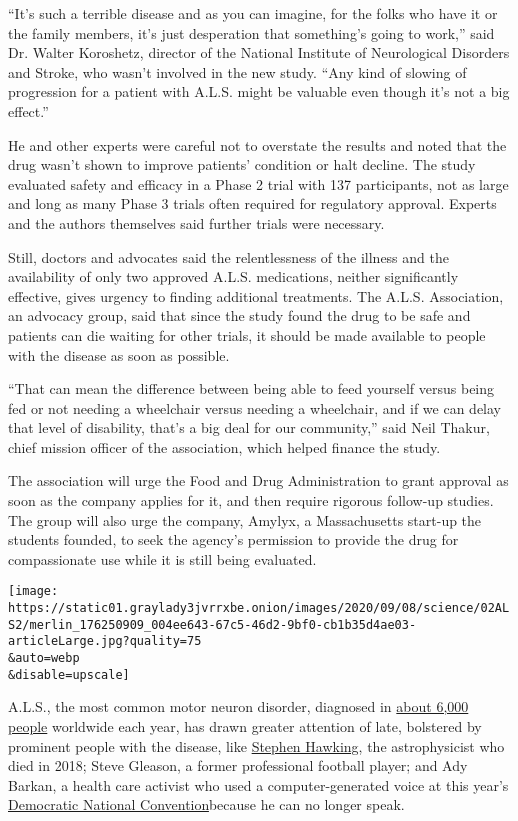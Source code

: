 ``It's such a terrible disease and as you can imagine, for the folks who
have it or the family members, it's just desperation that something's
going to work,'' said Dr. Walter Koroshetz, director of the National
Institute of Neurological Disorders and Stroke, who wasn't involved in
the new study. ``Any kind of slowing of progression for a patient with
A.L.S. might be valuable even though it's not a big effect.''

He and other experts were careful not to overstate the results and noted
that the drug wasn't shown to improve patients' condition or halt
decline. The study evaluated safety and efficacy in a Phase 2 trial with
137 participants, not as large and long as many Phase 3 trials often
required for regulatory approval. Experts and the authors themselves
said further trials were necessary.

Still, doctors and advocates said the relentlessness of the illness and
the availability of only two approved A.L.S. medications, neither
significantly effective, gives urgency to finding additional treatments.
The A.L.S. Association, an advocacy group, said that since the study
found the drug to be safe and patients can die waiting for other trials,
it should be made available to people with the disease as soon as
possible.

``That can mean the difference between being able to feed yourself
versus being fed or not needing a wheelchair versus needing a
wheelchair, and if we can delay that level of disability, that's a big
deal for our community,'' said Neil Thakur, chief mission officer of the
association, which helped finance the study.

The association will urge the Food and Drug Administration to grant
approval as soon as the company applies for it, and then require
rigorous follow-up studies. The group will also urge the company,
Amylyx, a Massachusetts start-up the students founded, to seek the
agency's permission to provide the drug for compassionate use while it
is still being evaluated.

\texttt{[image: https://static01.graylady3jvrrxbe.onion/images/2020/09/08/science/02ALS2/merlin\_176250909\_004ee643-67c5-46d2-9bf0-cb1b35d4ae03-articleLarge.jpg?quality=75\\\&auto=webp\\\&disable=upscale]}

A.L.S., the most common motor neuron disorder, diagnosed in
\href{https://alsnewstoday.com/how-common-is-als/\#:~:text=The\%20average\%20incidence\%20rate\%20of,ratio\%20of\%201.5\%20to\%201).}{about
6,000 people} worldwide each year, has drawn greater attention of late,
bolstered by prominent people with the disease, like
\href{https://www.nytimes3xbfgragh.onion/2018/03/14/obituaries/stephen-hawking-dead.html}{Stephen
Hawking}, the astrophysicist who died in 2018; Steve Gleason, a former
professional football player; and Ady Barkan, a health care activist who
used a computer-generated voice at this year's
\href{https://www.youtube.com/watch?v=XV7xSzXyaT8}{Democratic National
Convention}because he can no longer speak.

